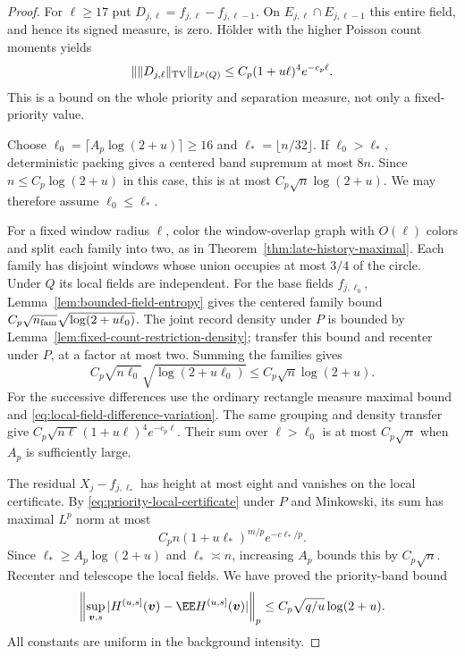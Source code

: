 \documentclass[11pt,letterpaper]{article}
\begin{document}
\begin{proof}
For $\ell\ge17$ put $D_{j,\ell}=f_{j,\ell}-f_{j,\ell-1}$.
On $E_{j,\ell}\cap E_{j,\ell-1}$ this entire field, and
hence its signed measure, is zero.
H\"older with the higher Poisson count moments yields
\begin{equation}\label{eq:local-field-difference-variation}
 \|\|D_{j,\ell}\|_{\rm TV}\|_{L^p(Q)}
                   \le C_p(1+u\ell)^4e^{-c_p\ell}.
\end{equation}
This is a bound on the whole priority and separation
measure, not only a fixed-priority value.

Choose $\ell_0=\lceil A_p\log(2+u)\rceil\ge16$ and
$\ell_*=\lfloor n/32\rfloor$.
If $\ell_0>\ell_*$, deterministic packing gives a centered
band supremum at most $8n$. Since
$n\le C_p\log(2+u)$ in this case, this is at most
$C_p\sqrt n\log(2+u)$.
We may therefore assume $\ell_0\le\ell_*$.

For a fixed window radius $\ell$, color the window-overlap
graph with $O(\ell)$ colors and split each family into two,
as in Theorem~\ref{thm:late-history-maximal}.
Each family has disjoint windows whose union occupies at
most $3/4$ of the circle.
Under $Q$ its local fields are independent.
For the base fields $f_{j,\ell_0}$,
Lemma~\ref{lem:bounded-field-entropy} gives the centered
family bound
$C_p\sqrt{n_{\rm fam}}\sqrt{\log(2+u\ell_0)}$.
The joint record density under $P$ is bounded by
Lemma~\ref{lem:fixed-count-restriction-density};
transfer this bound and recenter under $P$, at a factor
at most two. Summing the families gives
\[
 C_p\sqrt{n\ell_0}\sqrt{\log(2+u\ell_0)}
                                  \le C_p\sqrt n\log(2+u).
\]
For the successive differences use the ordinary rectangle
measure maximal bound and
\eqref{eq:local-field-difference-variation}.
The same grouping and density transfer give
$C_p\sqrt{n\ell}(1+u\ell)^4e^{-c_p\ell}$.
Their sum over $\ell>\ell_0$ is at most $C_p\sqrt n$
when $A_p$ is sufficiently large.

The residual $X_j-f_{j,\ell_*}$ has height at most eight
and vanishes on the local certificate.
By \eqref{eq:priority-local-certificate} under $P$ and
Minkowski, its sum has maximal $L^p$ norm at most
\[
 C_p n(1+u\ell_*)^{m/p}e^{-c\ell_*/p}.
\]
Since $\ell_*\ge A_p\log(2+u)$ and $\ell_*\asymp n$,
increasing $A_p$ bounds this by $C_p\sqrt n$.
Recenter and telescope the local fields.
We have proved the priority-band bound
\begin{equation}\label{eq:late-priority-band-maximal}
 \left\|\sup_{\boldsymbol v,s}
    |H^{(u,s]}(\boldsymbol v)-\EE H^{(u,s]}(\boldsymbol v)|
                                                    \right\|_p
                   \le C_p\sqrt{q/u}\log(2+u).
\end{equation}
All constants are uniform in the background intensity.


\end{proof}
\end{document}

